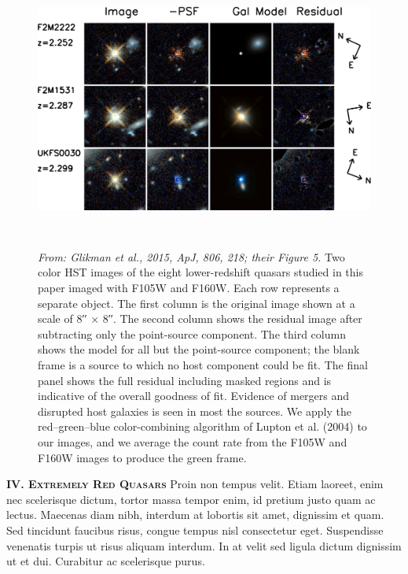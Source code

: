 \documentclass[11pt,epsf]{article}
\begin{document}
\begin{figure}[h]
  \begin{center}
   \hspace{-0.5cm}
    \includegraphics[height=8.5cm,width=16.2cm]
   {figs/Glikman_2015_ApJ_806_218_Fig5_hr.jpg}
   \caption{     \footnotesize
     {\it From: Glikman et al., 2015, ApJ, 806, 218; their Figure 5.}
     Two color HST images of the eight lower-redshift quasars studied in
     this paper imaged with F105W and F160W. Each row represents a separate
     object. The first column is the original image shown at a scale of 8′′
     × 8′′. The second column shows the residual image after subtracting
     only the point-source component. The third column shows the model for
     all but the point-source component; the blank frame is a source to
     which no host component could be fit. The final panel shows the full
     residual including masked regions and is indicative of the overall
     goodness of fit. Evidence of mergers and disrupted host galaxies is
     seen in most the sources. We apply the red–green–blue color-combining
     algorithm of Lupton et al. (2004) to our images, and we average the
     count rate from the F105W and F160W images to produce the green frame.
}
  \vspace{-14pt}
 \label{figtest-fig}
\end{center}
\end{figure}

\medskip
\medskip

\smallskip
\smallskip
\noindent
\textbf{\textsc{IV. Extremely Red Quasars}} 
Proin non tempus velit. Etiam laoreet, enim nec scelerisque dictum,
tortor massa tempor enim, id pretium justo quam ac lectus. Maecenas
diam nibh, interdum at lobortis sit amet, dignissim et quam. Sed
tincidunt faucibus risus, congue tempus nisl consectetur
eget. Suspendisse venenatis turpis ut risus aliquam interdum. In at
velit sed ligula dictum dignissim ut et dui. Curabitur ac scelerisque
purus.
\end{document}
